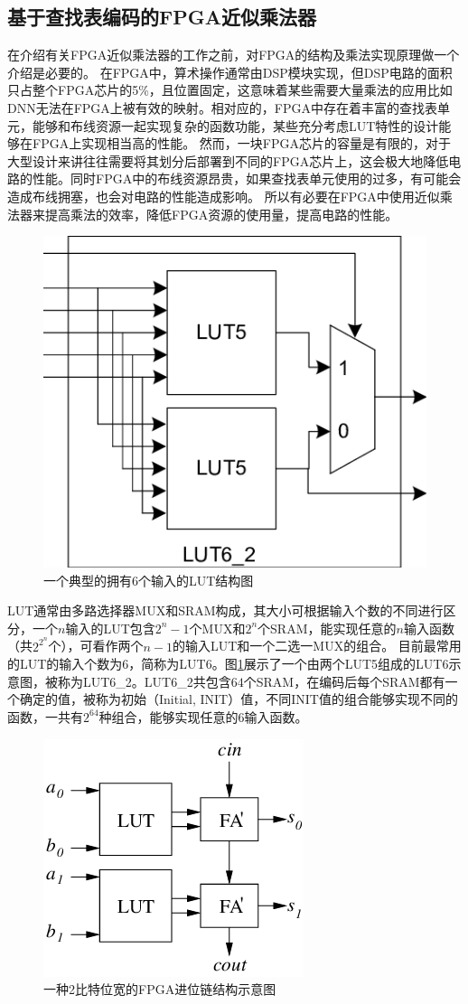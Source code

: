 \subsection{基于查找表编码的FPGA近似乘法器}

在介绍有关FPGA近似乘法器的工作之前，对FPGA的结构及乘法实现原理做一个介绍是必要的。
在FPGA中，算术操作通常由DSP模块实现，但DSP电路的面积只占整个FPGA芯片的5\%，且位置固定\cite{FPGA:DSP}，这意味着某些需要大量乘法的应用比如DNN无法在FPGA上被有效的映射\cite{FPGA:Math}。相对应的，FPGA中存在着丰富的查找表单元，能够和布线资源一起实现复杂的函数功能，某些充分考虑LUT特性的设计能够在FPGA上实现相当高的性能\cite{FPGA:PolyLUT}。
然而，一块FPGA芯片的容量是有限的，对于大型设计来讲往往需要将其划分后部署到不同的FPGA芯片上，这会极大地降低电路的性能。同时FPGA中的布线资源昂贵，如果查找表单元使用的过多，有可能会造成布线拥塞，也会对电路的性能造成影响。
所以有必要在FPGA中使用近似乘法器来提高乘法的效率，降低FPGA资源的使用量，提高电路的性能。

\begin{figure}[!h]
    \centering
    \includegraphics[width=0.5\linewidth]{figs/FPGA-LUT6_2.png}
    \caption{一个典型的拥有6个输入的LUT结构图}
    \label{FPGA:Fig:LUT6_2}
\end{figure}

LUT通常由多路选择器MUX和SRAM构成，其大小可根据输入个数的不同进行区分，一个$n$输入的LUT包含$2^n -1$个MUX和$2^n$个SRAM，能实现任意的$n$输入函数（共$2^{2^n}$个），可看作两个$n-1$的输入LUT和一个二选一MUX的组合。
目前最常用的LUT的输入个数为6\cite{FPGA:VIB}，简称为LUT6。图\ref{FPGA:Fig:LUT6_2}展示了一个由两个LUT5组成的LUT6示意图，被称为LUT6\_2。LUT6\_2共包含$64$个SRAM，在编码后每个SRAM都有一个确定的值，被称为初始（Initial, INIT）值，不同INIT值的组合能够实现不同的函数，一共有$2^{64}$种组合，能够实现任意的6输入函数。

\begin{figure}[!h]
    \centering
    \includegraphics[width=0.4\linewidth]{figs/FPGA-carry_chain.png}
    \caption{一种2比特位宽的FPGA进位链结构示意图}
    \label{FPGA:Fig:carry_chain}
\end{figure}

